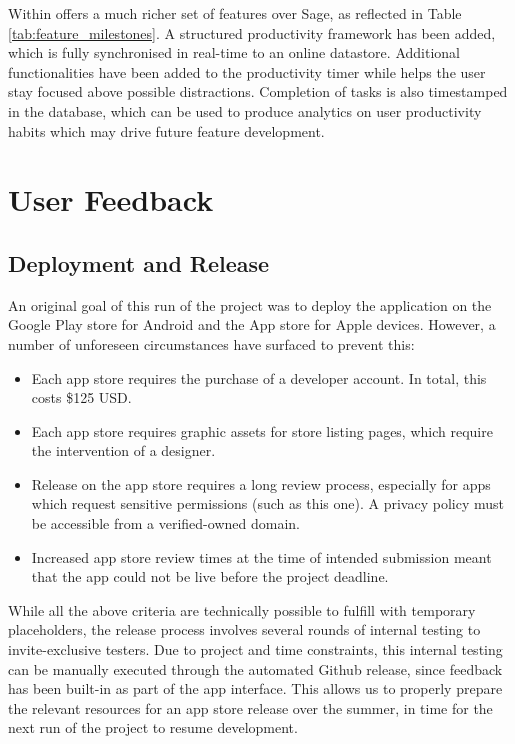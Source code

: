 Within offers a much richer set of features over Sage, as reflected in Table \ref{tab:feature_milestones}. A structured productivity framework has been added, which is fully synchronised in real-time to an online datastore. Additional functionalities have been added to the productivity timer while helps the user stay focused above possible distractions. Completion of tasks is also timestamped in the database, which can be used to produce analytics on user productivity habits which may drive future feature development.

\section{User Feedback}
\subsection{Deployment and Release}
An original goal of this run of the project was to deploy the application on the Google Play store for Android and the App store for Apple devices. However, a number of unforeseen circumstances have surfaced to prevent this:

\begin{itemize}
	\item Each app store requires the purchase of a developer account. In total, this costs \$125 USD.
	\item Each app store requires graphic assets for store listing pages, which require the intervention of a designer.
	\item Release on the app store requires a long review process, especially for apps which request sensitive permissions (such as this one). A privacy policy must be accessible from a verified-owned domain.
	\item Increased app store review times at the time of intended submission meant that the app could not be live before the project deadline.
\end{itemize}

While all the above criteria are technically possible to fulfill with temporary placeholders, the release process involves several rounds of internal testing to invite-exclusive testers. Due to project and time constraints, this internal testing can be manually executed through the automated Github release, since feedback has been built-in as part of the app interface. This allows us to properly prepare the relevant resources for an app store release over the summer, in time for the next run of the project to resume development.

